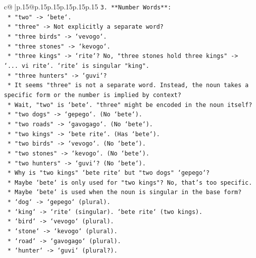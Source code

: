 \documentclass{article}
\begin{document}
{\begin{supertabular}{c@{$\;$}|p{.15\linewidth}@{}p{.15\linewidth}p{.15\linewidth}p{.15\linewidth}p{.15\linewidth}p{.15\linewidth}}
{{{\texttt{3.  **Number Words**:} \\
\texttt{    *   "two" {-}> `bete`.} \\
\texttt{    *   "three" {-}> Not explicitly a separate word?} \\
\texttt{        *   "three birds" {-}> `vevogo`.} \\
\texttt{        *   "three stones" {-}> `kevogo`.} \\
\texttt{        *   "three kings" {-}> `rite`? No, "three stones hold three kings" {-}> `... vi rite`. `rite` is singular "king".} \\
\texttt{        *   "three hunters" {-}> `guvi`?} \\
\texttt{        *   It seems "three" is not a separate word. Instead, the noun takes a specific form or the number is implied by context?} \\
\texttt{        *   Wait, "two" is `bete`. "three" might be encoded in the noun itself?} \\
\texttt{        *   "two dogs" {-}> `gepego`. (No `bete`).} \\
\texttt{        *   "two roads" {-}> `gavogago`. (No `bete`).} \\
\texttt{        *   "two kings" {-}> `bete rite`. (Has `bete`).} \\
\texttt{        *   "two birds" {-}> `vevogo`. (No `bete`).} \\
\texttt{        *   "two stones" {-}> `kevogo`. (No `bete`).} \\
\texttt{        *   "two hunters" {-}> `guvi`? (No `bete`).} \\
\texttt{        *   Why is "two kings" `bete rite` but "two dogs" `gepego`?} \\
\texttt{        *   Maybe `bete` is only used for "two kings"? No, that's too specific.} \\
\texttt{        *   Maybe `bete` is used when the noun is singular in the base form?} \\
\texttt{            *   `dog` {-}> `gepego` (plural).} \\
\texttt{            *   `king` {-}> `rite` (singular). `bete rite` (two kings).} \\
\texttt{            *   `bird` {-}> `vevogo` (plural).} \\
\texttt{            *   `stone` {-}> `kevogo` (plural).} \\
\texttt{            *   `road` {-}> `gavogago` (plural).} \\
\texttt{            *   `hunter` {-}> `guvi` (plural?).} \\
}}}
\end{supertabular}}
\end{document}
